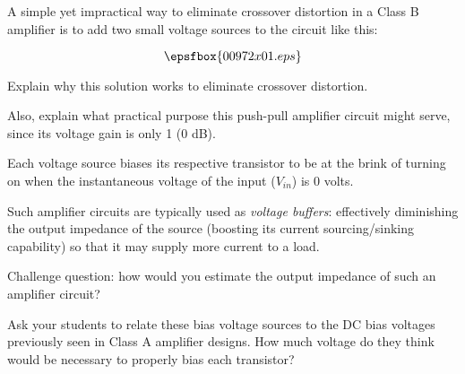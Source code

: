 

A simple yet impractical way to eliminate crossover distortion in a Class B amplifier is to add two small voltage sources to the circuit like this:

$$\epsfbox{00972x01.eps}$$

Explain why this solution works to eliminate crossover distortion.

\vskip 10pt

Also, explain what practical purpose this push-pull amplifier circuit might serve, since its voltage gain is only 1 (0 dB).







Each voltage source biases its respective transistor to be at the brink of turning on when the instantaneous voltage of the input ($V_{in}$) is 0 volts.

\vskip 10pt

Such amplifier circuits are typically used as {\it voltage buffers}: effectively diminishing the output impedance of the source (boosting its current sourcing/sinking capability) so that it may supply more current to a load.

\vskip 10pt

Challenge question: how would you estimate the output impedance of such an amplifier circuit?







Ask your students to relate these bias voltage sources to the DC bias voltages previously seen in Class A amplifier designs.  How much voltage do they think would be necessary to properly bias each transistor?




